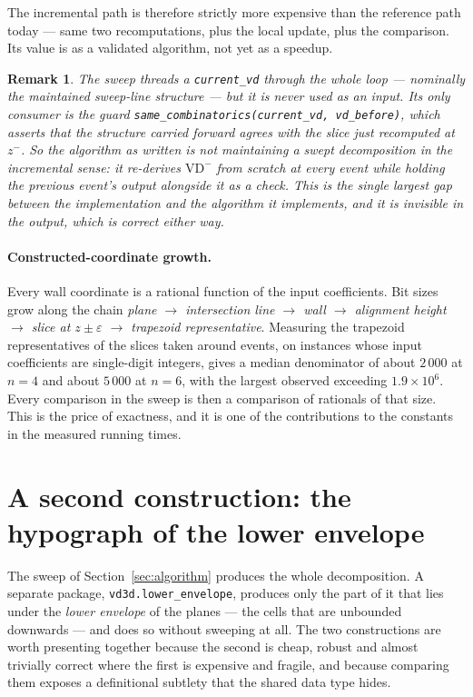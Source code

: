 \documentclass[11pt]{article}
\newtheorem{remark}{Remark}
\newcommand{\VD}{\mathrm{VD}}
\begin{document}
The incremental path is therefore strictly more expensive than the reference
path today --- same two recomputations, plus the local update, plus the
comparison.  Its value is as a validated algorithm, not yet as a speedup.

\begin{remark}
\label{rem:current-vd}
The sweep threads a \texttt{current\_vd} through the whole loop --- nominally
the maintained sweep-line structure --- but it is never used as an input.  Its
only consumer is the guard
\verb|same_combinatorics(current_vd, vd_before)|, which asserts that the
structure carried forward agrees with the slice just recomputed at $z^-$.  So
the algorithm as written is not maintaining a swept decomposition in the
incremental sense: it re-derives $\VD^-$ from scratch at every event while
holding the previous event's output alongside it as a check.  This is the
single largest gap between the implementation and the algorithm it implements,
and it is invisible in the output, which is correct either way.
\end{remark}

\paragraph{Constructed-coordinate growth.}
Every wall coordinate is a rational function of the input coefficients.  Bit
sizes grow along the chain \emph{plane $\to$ intersection line $\to$ wall $\to$
alignment height $\to$ slice at $z \pm \varepsilon$ $\to$ trapezoid
representative}.  Measuring the trapezoid representatives of the slices taken
around events, on instances whose input coefficients are single-digit integers,
gives a median denominator of about $2\,000$ at $n = 4$ and about $5\,000$ at
$n = 6$, with the largest observed exceeding $1.9 \times 10^{6}$.  Every
comparison in the sweep is then a comparison of rationals of that size.  This is
the price of exactness, and it is one of the contributions to the constants in
the measured running times.

\section{A second construction: the hypograph of the lower envelope}
\label{sec:hypograph}

The sweep of Section~\ref{sec:algorithm} produces the whole decomposition.  A
separate package, \texttt{vd3d.lower\_envelope}, produces only the part of it
that lies under the \emph{lower envelope} of the planes --- the cells that are
unbounded downwards --- and does so without sweeping at all.  The two
constructions are worth presenting together because the second is cheap,
robust and almost trivially correct where the first is expensive and fragile,
and because comparing them exposes a definitional subtlety that the shared data
type hides.
\end{document}
